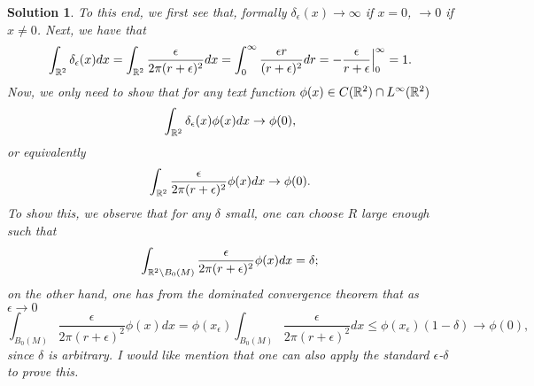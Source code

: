 \documentclass[6pt]{article}
\newtheorem{solution}{Solution}
\numberwithin{equation}{section}
\def\mathbb{\Bbb}
\begin{document}
\begin{enumerate}
\begin{solution}
To this end, we first see that, formally $\delta_\epsilon(x)\rightarrow \infty$ if $x=0$, $\rightarrow 0$ if $x\neq 0$.  Next, we have that
\[\int_{\mathbb R^2}\delta_\epsilon(x)dx=\int_{\mathbb R^2} \frac{\epsilon}{2\pi(r+\epsilon)^2} dx=\int_0^\infty \frac{\epsilon r}{(r+\epsilon)^2}dr=-\frac{\epsilon}{r+\epsilon}\Big|_0^\infty=1.\]
Now, we only need to show that for any text function $\phi(x)\in C(\mathbb R^2)\cap L^\infty (\mathbb R^2)$
\[\int_{\mathbb R^2}\delta_\epsilon(x)\phi(x)dx\rightarrow\phi(0),\]
or equivalently
\[\int_{\mathbb R^2}\frac{\epsilon}{2\pi(r+\epsilon)^2}\phi(x)dx\rightarrow\phi(0).\]
To show this, we observe that for any $\delta$ small, one can choose $R$ large enough such that
\[\int_{\mathbb R^2\backslash B_0(M)}\frac{\epsilon}{2\pi(r+\epsilon)^2}\phi(x)dx=\delta;\]
on the other hand, one has from the dominated convergence theorem that as $\epsilon \rightarrow 0$
\[\int_{B_0(M)}\frac{\epsilon}{2\pi(r+\epsilon)^2}\phi(x)dx=\phi(x_\epsilon) \int_{B_0(M)}\frac{\epsilon}{2\pi(r+\epsilon)^2}dx\leq \phi(x_\epsilon)(1-\delta)\rightarrow \phi(0),\]
since $\delta$ is arbitrary.  I would like mention that one can also apply the standard $\epsilon$-$\delta$ to prove this.
\end{solution}

\end{enumerate}
\end{document}
